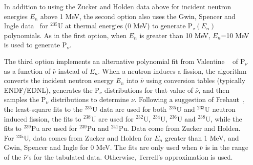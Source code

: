 In addition to using the Zucker and Holden data above for incident
neutron energies $E_n$ above 1 MeV, the second
option also uses the Gwin, Spencer and
Ingle data~\cite{Gwin 1984} for $^{235}$U at thermal energies (0 MeV) 
to generate P$_{\nu}(E_n)$ polynomials. As in the first option, when
$E_n$ is greater than 10 MeV, $E_n$=10 MeV is used to generate
P$_{\nu}$.

The third option implements an alternative
polynomial fit from Valentine ~\cite{Valentine 2000} of  P$_{\nu}$
as a function of $\bar{\nu}$ instead of $E_n$.
%
%
When a neutron induces a fission, the algorithm converts the incident
neutron energy $E_n$ into $\bar{\nu}$ using conversion tables
(typically ENDF/EDNL), generates the P$_{\nu}$ distributions for that
value of $\bar{\nu}$, and then samples the P$_{\nu}$ distributions to
determine $\nu$. Following a suggestion of Frehaut~\cite{Frehaut 1988},
the least-square fits to the $^{235}$U data are used for both $^{235}$U 
and $^{233}$U neutron induced fission, the fits to $^{238}$U are used 
for $^{232}$U, $^{234}$U, $^{236}$U and $^{238}$U, while the fits to 
$^{239}$Pu are used for $^{239}$Pu and $^{241}$Pu. Data come from
Zucker and Holden. For $^{235}$U, data comes from Zucker and Holden 
for $E_n$ greater than 1 MeV, and Gwin, Spencer and
Ingle for 0 MeV. The fits are only used when $\bar{\nu}$ is in the 
range of the $\bar{\nu}$'s for the tabulated data. Otherwise, 
Terrell's approximation is used.

